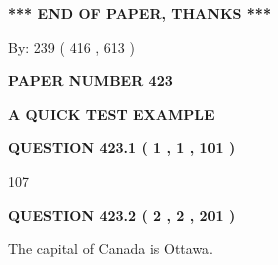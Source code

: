 \documentclass[12pt]{article}
\begin{document}
 
 
 
   
   
 \vspace{0.2in}
 
   
   
   
   
\vspace{1.0in} 
{\textbf{\large{ *** END OF PAPER, THANKS *** }}} 
   
   
\hspace{1.0in} By: 
 239 ( 416 ,  613 )
   
   
   
   
\newpage 
\setcounter{page}{ 
   423001 } 
   
   
   
   
 {\textbf{ \Large{ PAPER NUMBER  423  }}}
   
   
\vspace{0.2in}
   
   
   
   
   
   
 \vspace{0.2in}
{\LARGE {\textbf{ A QUICK TEST EXAMPLE}}}
   
   
  
\vspace{0.2in}
  
{\textbf{\Large{QUESTION
423.1 
 ( 1 , 1 , 101 )
}}}
  
  
 
 
\noindent{}

107
 
 
  
\vspace{0.2in}
  
{\textbf{\Large{QUESTION
423.2 
 ( 2 , 2 , 201 )
}}}
  
  
 
 
\noindent{}
 
 
The capital of Canada is Ottawa.
 
 
 
 
   
   
 \vspace{0.2in}
 
   
   
   
   
\end{document}

